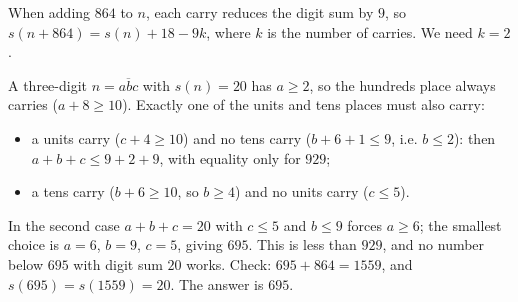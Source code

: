 When adding $864$ to $n$, each carry reduces the digit sum by $9$, so $s(n+864)=s(n)+18-9k$, where $k$ is the number of carries. We need $k=2$.

A three-digit $n=\overline{abc}$ with $s(n)=20$ has $a\ge2$, so the hundreds place always carries ($a+8\ge10$). Exactly one of the units and tens places must also carry:
\begin{itemize}
\item a units carry ($c+4\ge10$) and no tens carry ($b+6+1\le9$, i.e. $b\le2$): then $a+b+c\le9+2+9$, with equality only for $929$;
\item a tens carry ($b+6\ge10$, so $b\ge4$) and no units carry ($c\le5$).
\end{itemize}
In the second case $a+b+c=20$ with $c\le5$ and $b\le9$ forces $a\ge6$; the smallest choice is $a=6$, $b=9$, $c=5$, giving $695$. This is less than $929$, and no number below $695$ with digit sum $20$ works. Check: $695+864=1559$, and $s(695)=s(1559)=20$. The answer is $\boxed{695}$.
